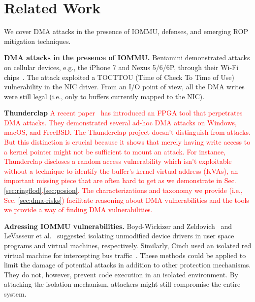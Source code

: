 \section{Related Work}
We cover DMA attacks in the presence of IOMMU, defenses, and emerging ROP mitigation techniques.

\smallskip
\noindent\textbf{DMA attacks in the presence of IOMMU.}
Beniamini demonstrated attacks on cellular devices, e.g., the iPhone 7 and Nexus 5/6/6P, through their Wi-Fi chips~\cite{Ben17a, Ben17b}. 
The attack exploited a TOCTTOU (Time of Check To Time of Use) vulnerability in the NIC driver. From an I/O point of view, all the DMA writes were still legal (i.e., only to buffers currently mapped to the NIC).

\noindent\textbf{Thunderclap} \textcolor{red}{A recent paper~\cite{thunder} has introduced an FPGA tool that perpetrates DMA attacks. They demonstrated several ad-hoc \simple DMA attacks on Windows, macOS, and FreeBSD. The Thunderclap project doesn't distinguish \simple from \compound attacks. But this distinction is crucial because it shows that merely having write access to a kernel pointer might not be sufficient to mount an attack. For instance, Thunderclap discloses a random access vulnerability which isn't exploitable without a technique to identify the buffer's kernel virtual address (KVAs), an important missing piece that are often hard to get as we demonstrate in Sec. \ref{sec:ringflod},\ref{sec:posion}. The characterizations and taxonomy we provide (i.e., Sec. \ref{sec:dma-risks}) facilitate reasoning about DMA vulnerabilities and the tools we provide a way of finding DMA vulnerabilities.}

\smallskip
\noindent\textbf{Adressing IOMMU vulnerabilities.}
Boyd-Wickizer and Zeldovich~\cite{BWZ10} and LeVasseur et al.~\cite{LUSG04} suggested isolating unmodified device drivers in user space programs and virtual machines, respectively. Similarly, Cinch used an isolated red virtual machine for intercepting bus traffic~\cite{AWH16}. These methods could be applied to limit the damage of potential attacks in addition to other protection mechanisms. They do not, however, prevent code execution in an isolated environment. By attacking the isolation mechanism, attackers might still compromise the entire system.


